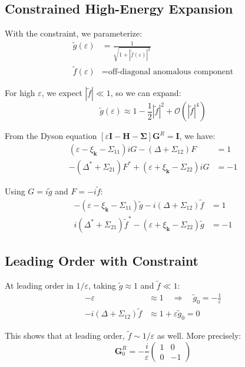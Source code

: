 \documentclass[12pt]{article}
\begin{document}
\subsection{Constrained High-Energy Expansion}

With the constraint, we parameterize:
\begin{align}
\tilde{g}(\varepsilon) &= \frac{1}{\sqrt{1 + |\tilde{f}(\varepsilon)|^2}} \\
\tilde{f}(\varepsilon) &= \text{off-diagonal anomalous component}
\end{align}

For high $\varepsilon$, we expect $|\tilde{f}| \ll 1$, so we can expand:
\begin{equation}
\tilde{g}(\varepsilon) \approx 1 - \frac{1}{2}|\tilde{f}|^2 + \mathcal{O}(|\tilde{f}|^4)
\end{equation}

From the Dyson equation $[\varepsilon \mathbf{I} - \mathbf{H} - \mathbf{\Sigma}]\mathbf{G}^R = \mathbf{I}$, we have:
\begin{align}
(\varepsilon - \xi_{\mathbf{k}} - \Sigma_{11})iG - (\Delta + \Sigma_{12})F &= 1 \\
-(\Delta^* + \Sigma_{21})F^* + (\varepsilon + \xi_{\mathbf{k}} - \Sigma_{22})iG &= -1
\end{align}

Using $G = i\tilde{g}$ and $F = -i\tilde{f}$:
\begin{align}
-(\varepsilon - \xi_{\mathbf{k}} - \Sigma_{11})\tilde{g} - i(\Delta + \Sigma_{12})\tilde{f} &= 1 \\
i(\Delta^* + \Sigma_{21})\tilde{f}^* - (\varepsilon + \xi_{\mathbf{k}} - \Sigma_{22})\tilde{g} &= -1
\end{align}

\subsection{Leading Order with Constraint}

At leading order in $1/\varepsilon$, taking $\tilde{g} \approx 1$ and $\tilde{f} \ll 1$:
\begin{align}
-\varepsilon &\approx 1 \quad \Rightarrow \quad \tilde{g}_0 = -\frac{1}{\varepsilon} \\
-i(\Delta + \Sigma_{12})\tilde{f} &\approx 1 + \varepsilon\tilde{g}_0 = 0
\end{align}

This shows that at leading order, $\tilde{f} \sim 1/\varepsilon$ as well. More precisely:
\begin{equation}
\mathbf{G}^R_0 = -\frac{i}{\varepsilon}\begin{pmatrix}
1 & 0 \\
0 & -1
\end{pmatrix}
\end{equation}
\end{document}
